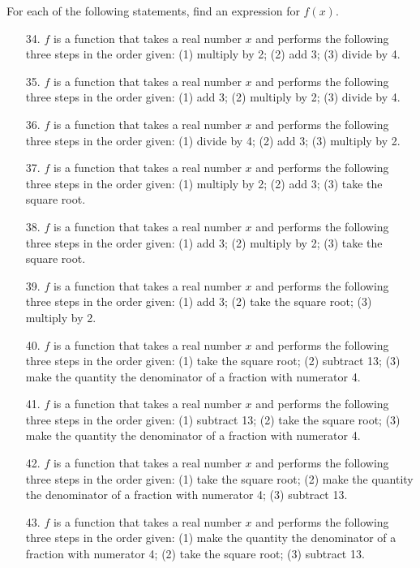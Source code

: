 \documentclass[12pt]{book}
\theoremstyle{definition}
\begin{document}
For each of the following statements, find an expression for $f(x)$.

\begin{enumerate}
\item[34.] $f$ is a function that takes a real number $x$ and performs the following three steps in the order given: (1) multiply by 2; (2) add 3; (3) divide by 4.
\item[35.] $f$ is a function that takes a real number $x$ and performs the following three steps in the order given: (1) add 3; (2) multiply by 2; (3) divide by 4. 
\item[36.] $f$ is a function that takes a real number $x$ and performs the following three steps in the order given: (1) divide by 4; (2) add 3; (3) multiply by 2.
\item[37.] $f$ is a function that takes a real number $x$ and performs the following three steps in the order given: (1) multiply by 2; (2) add 3; (3) take the square root.
\item[38.] $f$ is a function that takes a real number $x$ and performs the following three steps in the order given: (1) add 3; (2) multiply by 2; (3) take the square root.
\item[39.] $f$ is a function that takes a real number $x$ and performs the following three steps in the order given: (1) add 3; (2) take the square root; (3) multiply by 2.
\item[40.] $f$ is a function that takes a real number $x$ and performs the following three steps in the order given: (1) take the square root; (2) subtract 13; (3) make the quantity the denominator of a fraction with numerator 4. 
\item[41.] $f$ is a function that takes a real number $x$ and performs the following three steps in the order given: (1) subtract 13; (2) take the square root; (3) make the quantity the denominator of a fraction with numerator 4.  
\item[42.] $f$ is a function that takes a real number $x$ and performs the following three steps in the order given: (1) take the square root; (2) make the quantity the denominator of a fraction with numerator 4; (3) subtract 13. 
\item[43.] $f$ is a function that takes a real number $x$ and performs the following three steps in the order given: (1) make the quantity the denominator of a fraction with numerator 4; (2) take the square root; (3) subtract 13.
\end{enumerate}
\end{document}
